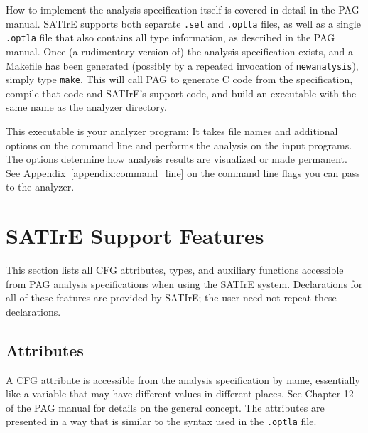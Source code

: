 \documentclass[a4paper,12pt]{report}
\begin{document}
How to implement the analysis specification itself is covered in detail in
the PAG manual. SATIrE supports both separate \texttt{.set} and
\texttt{.optla} files, as well as a single \texttt{.optla} file that also
contains all type information, as described in the PAG manual. Once (a
rudimentary version of) the analysis specification exists, and a Makefile
has been generated (possibly by a repeated invocation of
\texttt{newanalysis}), simply type \verb|make|. This will call PAG to
generate C code from the specification, compile that code and SATIrE's
support code, and build an executable with the same name as the analyzer
directory.

This executable is your analyzer program: It takes file names and additional
options on the command line and performs the analysis on the input programs.
The options determine how analysis results are visualized or made permanent.
See Appendix~\ref{appendix:command_line} on the command line flags you can
pass to the analyzer.

\section{SATIrE Support Features}
\label{sec:support_stuff}

This section lists all CFG attributes, types, and auxiliary functions
accessible from PAG analysis specifications when using the SATIrE system.
Declarations for all of these features are provided by SATIrE; the user need
not repeat these declarations.

\newcommand{\ttitemX}[1]{\item[\texttt{#1}]}
\newcommand{\ttitem}[1]{\ttitemX{#1} \mbox{} \\}

\subsection{Attributes}
\label{sec:support_attributes}

A CFG attribute is accessible from the analysis specification by name,
essentially like a variable that may have different values in different
places. See Chapter 12 of the PAG manual for details on the general concept.
The attributes are presented in a way that is similar to the syntax used in
the \texttt{.optla} file.
\end{document}

